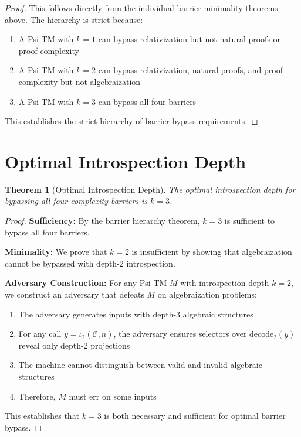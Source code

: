 \documentclass[11pt]{article}
\newtheorem{theorem}{Theorem}
\begin{document}
\begin{proof}
This follows directly from the individual barrier minimality theorems above. The hierarchy is strict because:

\begin{enumerate}
\item A Psi-TM with $k = 1$ can bypass relativization but not natural proofs or proof complexity
\item A Psi-TM with $k = 2$ can bypass relativization, natural proofs, and proof complexity but not algebraization
\item A Psi-TM with $k = 3$ can bypass all four barriers
\end{enumerate}

This establishes the strict hierarchy of barrier bypass requirements.
\end{proof}

\section{Optimal Introspection Depth}

\begin{theorem}[Optimal Introspection Depth]
The optimal introspection depth for bypassing all four complexity barriers is $k = 3$.
\end{theorem}

\begin{proof}
\textbf{Sufficiency:}
By the barrier hierarchy theorem, $k = 3$ is sufficient to bypass all four barriers.

\textbf{Minimality:}
We prove that $k = 2$ is insufficient by showing that algebraization cannot be bypassed with depth-2 introspection.

\textbf{Adversary Construction:}
For any Psi-TM $M$ with introspection depth $k = 2$, we construct an adversary that defeats $M$ on algebraization problems:

\begin{enumerate}
\item The adversary generates inputs with depth-3 algebraic structures
\item For any call $y=\iota_2(\mathcal{C},n)$, the adversary ensures selectors over $\mathrm{decode}_2(y)$ reveal only depth-2 projections
\item The machine cannot distinguish between valid and invalid algebraic structures
\item Therefore, $M$ must err on some inputs
\end{enumerate}

This establishes that $k = 3$ is both necessary and sufficient for optimal barrier bypass.
\end{proof}
\end{document}
